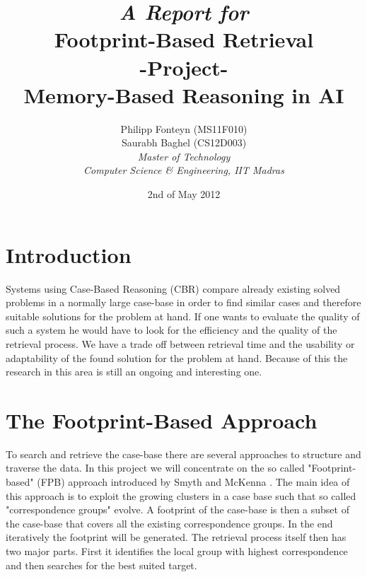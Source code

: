 \documentclass[11pt]{article}
\title{
	\emph{A Report for}\\
	\huge{\textbf{Footprint-Based Retrieval} }\\
	-Project-\\
	Memory-Based Reasoning in AI\\[2em]	
}
\author{
	Philipp Fonteyn (MS11F010)\\
	Saurabh Baghel (CS12D003)\\[2em]
	\emph{Master of Technology}\\
	\emph{Computer Science \& Engineering, IIT Madras}
}
\date{2nd of May 2012}
\begin{document}
\maketitle
\newpage

%
%
%
\section{Introduction}
Systems using Case-Based Reasoning (CBR) compare already existing solved problems in a normally large case-base in order to find similar cases and therefore suitable solutions for the problem at hand. If one wants to evaluate the quality of such a system he would have to look for the efficiency and the quality of the retrieval process. We have a trade off between retrieval time and the usability or adaptability of the found solution for the problem at hand. Because of this the research in this area is still an ongoing and interesting one.
%
%
%
\section{The Footprint-Based Approach}
To search and retrieve the case-base there are several approaches to structure and traverse the data. In this project we will concentrate on the so called "Footprint-based" (FPB) approach introduced by Smyth and McKenna \cite{FPBR}. The main idea of this approach is to exploit the growing clusters in a case base such that so called "correspondence groups" evolve. A footprint of the case-base is then a subset of the case-base that covers all the existing correspondence groups. In the end iteratively the footprint will be generated. The retrieval process itself then has two major parts. First it identifies the local group with highest correspondence and then searches for the best suited target. 
\end{document}
